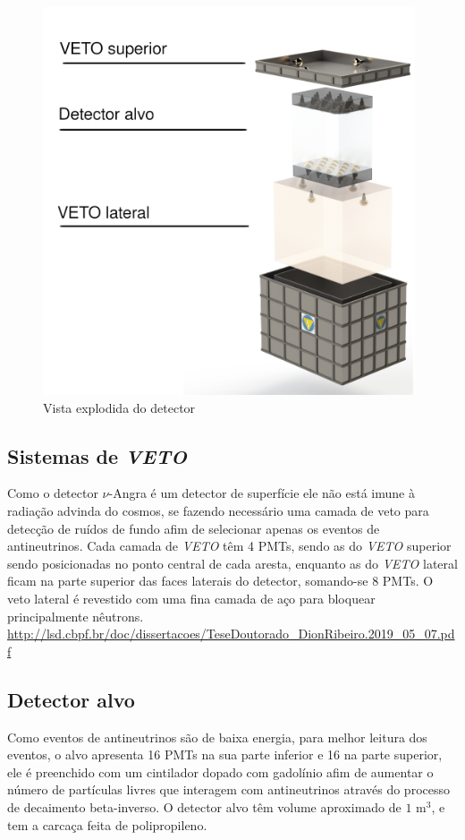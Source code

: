 \begin{figure}[H]
    \centering
    \includegraphics[width=11cm]{textuais/experimento/figuras/detector.png}
    \caption{Vista explodida do detector}
    \label{fig:detector}
\end{figure}

\subsection{Sistemas de \emph{VETO}}

Como o detector $\nu$-Angra é um detector de superfície ele não está imune à radiação advinda do cosmos, se fazendo necessário uma camada de veto para detecção de ruídos de fundo afim de selecionar apenas os eventos de antineutrinos. Cada camada de \emph{VETO} têm 4 PMTs, sendo as do \emph{VETO} superior sendo posicionadas no ponto central de cada aresta, enquanto as do \emph{VETO} lateral ficam na parte superior das faces laterais do detector, somando-se 8 PMTs. O veto lateral é revestido com uma fina camada de aço para bloquear principalmente nêutrons. \url{http://lsd.cbpf.br/doc/dissertacoes/TeseDoutorado_DionRibeiro.2019_05_07.pdf}

\subsection{Detector alvo}

Como eventos de antineutrinos são de baixa energia, para melhor leitura dos eventos, o alvo apresenta 16 PMTs na sua parte inferior e 16 na parte superior, ele é preenchido com um cintilador dopado com gadolínio afim de aumentar o número de partículas livres que interagem com antineutrinos através do processo de decaimento beta-inverso. O detector alvo têm volume aproximado de $1$  m$^3$, e tem a carcaça feita de polipropileno.



